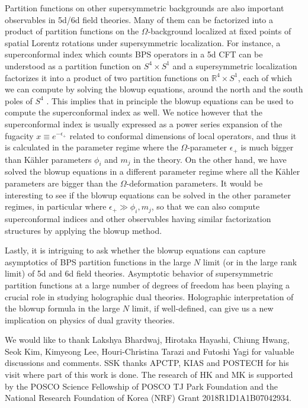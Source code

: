 Partition functions on other supersymmetric backgrounds are also important observables in 5d/6d field theories. Many of them can be factorized into a product of partition functions on the $\Omega$-background localized at fixed points of spatial Lorentz rotations under supersymmetric localization. For instance, a superconformal index which counts BPS operators in a 5d CFT can be understood as a partition function on $S^4\times S^1$ and a supersymmetric localization factorizes it into a product of two  partition functions on $\mathbb{R}^4\times S^1$, each of which we can compute by solving the blowup equations, around the north and the south poles of $S^4$ \cite{Kim:2012gu}. This implies that in principle the blowup equations can be used to compute the superconformal index as well. We notice however that the superconformal index is usually expressed as a power series expansion of the fugacity $x\equiv e^{-\epsilon_+}$ related to conformal dimensions of local operators, and thus it is calculated in the parameter regime where the $\Omega$-parameter $\epsilon_+$ is much bigger than K\"ahler parameters $\phi_i$ and $m_j$ in the theory. On the other hand, we have solved the blowup equations in a different parameter regime where all the K\"ahler parameters are bigger than the $\Omega$-deformation parameters. It would be interesting to see if the blowup equations can be solved in the other parameter regimes, in particular where $\epsilon_+\gg \phi_i,m_j$, so that we can also compute superconformal indices and other observables having similar factorization structures by applying the blowup method.

Lastly, it is intriguing to ask whether the blowup equations can capture asymptotics of BPS partition functions in the large $N$ limit (or in the large rank limit) of 5d and 6d field theories. Asymptotic behavior of supersymmetric partition functions at a large number of degrees of freedom has been playing a crucial role in studying holographic dual theories. Holographic interpretation of the blowup formula in the large $N$ limit, if well-defined, can give us a new implication on physics of dual gravity theories.

\acknowledgments
We would like to thank Lakshya Bhardwaj, Hirotaka Hayashi, Chiung Hwang, Seok Kim, Kimyeong Lee, Houri-Christina Tarazi and Futoshi Yagi for valuable discussions and comments. SSK thanks APCTP, KIAS and POSTECH for his visit where part of this work is done. The research of HK and MK is supported by the POSCO Science Fellowship of POSCO TJ Park Foundation and the National Research Foundation of Korea (NRF) Grant 2018R1D1A1B07042934.